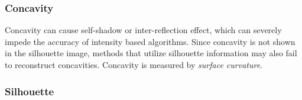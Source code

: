 

\subsubsection{Concavity}
Concavity can cause self-shadow or inter-reflection effect, which can severely impede the accuracy of intensity based algorithms. Since concavity is not shown in the silhouette image, methods that utilize silhouette information may also fail to reconstruct concavities. Concavity is measured by \textit{surface curvature}.

\subsubsection{Silhouette}


